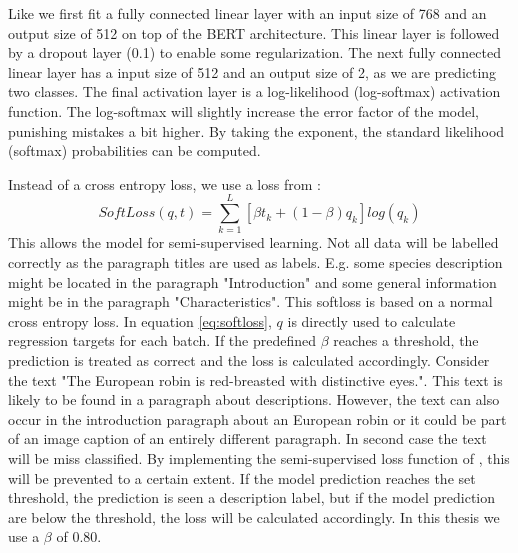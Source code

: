 \documentclass[a4paper, 12pt, oneside]{book} %
\begin{document}
Like \textcite{sun_how_2020} we first fit a fully connected linear layer with an input size of 768 and an output size of 512 on top of the BERT architecture. 
This linear layer is followed by a dropout layer (0.1) to enable some regularization.
The next fully connected linear layer has a input size of 512 and an output size of 2, as we are predicting two classes.
The final activation layer is a log-likelihood (log-softmax) activation function.
The log-softmax will slightly increase the error factor of the model, punishing mistakes a bit higher.
By taking the exponent, the standard likelihood (softmax) probabilities can be computed.

Instead of a cross entropy loss, we use a loss from \textcite{reed_training_2015}:
\begin{equation} \label{eq:softloss}
 SoftLoss(q, t) = \sum_{k=1}^{L}[\beta t _k + (1- \beta )q _k]log(q _k)
\end{equation}
This allows the model for semi-supervised learning.
Not all data will be labelled correctly as the paragraph titles are used as labels.
E.g. some species description might be located in the paragraph "Introduction" and some general information might be in the paragraph "Characteristics".
This softloss is based on a normal cross entropy loss.
In equation \ref{eq:softloss}, \(q\) is directly used to calculate regression targets for each batch.
If the predefined \(\beta\) reaches a threshold, the prediction is treated as correct and the loss is calculated accordingly.
Consider the text "The European robin is red-breasted with distinctive eyes.".
This text is likely to be found in a paragraph about descriptions.
However, the text can also occur in the introduction paragraph about an European robin or it could be part of an image caption of an entirely different paragraph. 
In second case the text will be miss classified. 
By implementing the semi-supervised loss function of \textcite{reed_training_2015}, this will be prevented to a certain extent.
If the model prediction reaches the set threshold, the prediction is seen a description label, but if the model prediction are below the threshold, the loss will be calculated accordingly.
In this thesis we use a \(\beta\) of 0.80. 
\end{document}
